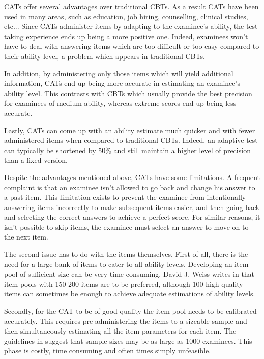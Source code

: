 CATs offer several advantages over traditional CBTs. As a result CATs have been used in many areas\cite{CAT-Areas}, such as education, job hiring, counselling, clinical studies, etc... Since CATs administer items by adapting to the examinee's ability, the test-taking experience ends up being a more positive one. Indeed, examinees won't have to deal with answering items which are too difficult or too easy compared to their ability level, a problem which appears in traditional CBTs.\newline

In addition, by administering only those items which will yield additional information, CATs end up being more accurate in estimating an examinee's ability level. This contrasts with CBTs which usually provide the best precision for examinees of medium ability, whereas extreme scores end up being less accurate.\newline

Lastly, CATs can come up with an ability estimate much quicker and with fewer administered items when compared to traditional CBTs. Indeed, an adaptive test can typically be shortened by 50\% and still maintain a higher level of precision than a fixed version.\cite{Weiss1984}
\newline

Despite the advantages mentioned above, CATs have some limitations. A frequent complaint is that an examinee isn't allowed to go back and change his answer to a past item. This limitation exists to prevent the examinee from intentionally answering items incorrectly to make subsequent items easier, and then going back and selecting the correct answers to achieve a perfect score. For similar reasons, it isn't possible to skip items, the examinee must select an answer to move on to the next item.\newline

The second issue has to do with the items themselves. First of all, there is the need for a large bank of items to cater to all ability levels. Developing an item pool of sufficient size can be very time consuming. David J. Weiss writes in \cite{Weiss1985} that item pools with 150-200 items are to be preferred, although 100 high quality items can sometimes be enough to achieve adequate estimations of ability levels. \newline

Secondly, for the CAT to be of good quality the item pool needs to be calibrated accurately. This requires pre-administering the items to a sizeable sample and then simultaneously estimating all the item parameters for each item. The guidelines in \cite{CAT-Primer} suggest that sample sizes may be as large as $1000$ examinees. This phase is costly, time consuming and often times simply unfeasible.\newline

